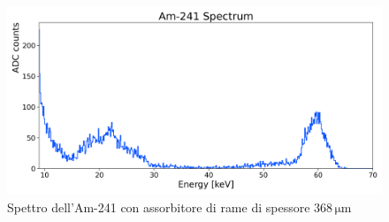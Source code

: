 \documentclass[twocolumn,10pt]{asme2ej}
\begin{document}
\pagebreak

\begin{figure}[t]
    \centering
    \includegraphics[width=\linewidth]{../Plots/am_spectrum_absorber.png}
    \caption{Spettro dell'Am-241 con assorbitore di rame di spessore $368\,\si{\micro\metre}$}
    \label{i:spettro_abs}
    \vspace{-15pt}
\end{figure}



\null
\vfill
\end{document}
